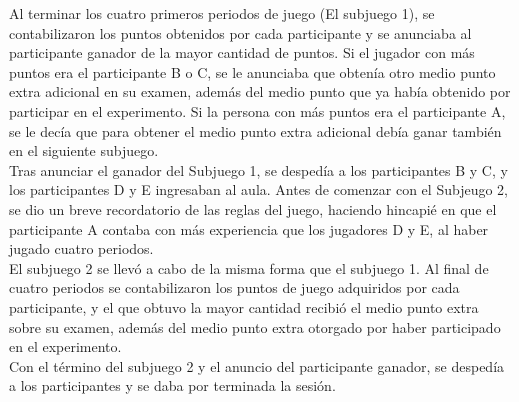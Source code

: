 Al terminar los cuatro primeros periodos de juego (El subjuego 1), se contabilizaron los puntos obtenidos por cada participante y se anunciaba al participante ganador de la mayor cantidad de puntos. Si el jugador con más puntos era el participante B o C, se le anunciaba que obtenía otro medio punto extra adicional en su examen, además del medio punto que ya había obtenido por participar en el experimento. Si la persona con más puntos era el participante A, se le decía que para obtener el medio punto extra adicional debía ganar también en el siguiente subjuego.\\

Tras anunciar el ganador del Subjuego 1, se despedía a los participantes B y C, y los participantes D y E ingresaban al aula. Antes de comenzar con el Subjeugo 2, se dio un breve recordatorio de las reglas del juego, haciendo hincapié en que el participante A contaba con más experiencia que los jugadores D y E, al haber jugado cuatro periodos.\\

El subjuego 2 se llevó a cabo de la misma forma que el subjuego 1. Al final de cuatro periodos se contabilizaron los puntos de juego adquiridos por cada participante, y el que obtuvo la mayor cantidad recibió el medio punto extra sobre su examen, además del medio punto extra otorgado por haber participado en el experimento.\\

Con el término del subjuego 2 y el anuncio del participante ganador, se despedía a los participantes y se daba por terminada la sesión.\\
